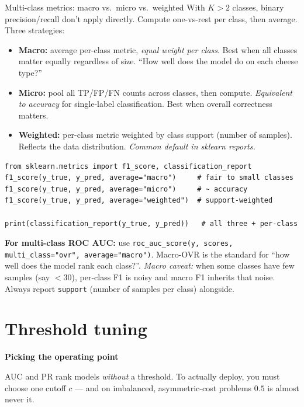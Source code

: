 \documentclass[aspectratio=169]{beamer}
\begin{document}
\begin{frame}[fragile]{Multi-class metrics: macro vs.\ micro vs.\ weighted}
  With $K > 2$ classes, binary precision/recall don't apply directly. Compute one-vs-rest per class, then average. Three strategies:
  \vfill
  \begin{itemize}\small
    \item \textbf{Macro:} average per-class metric, \emph{equal weight per class}. Best when all classes matter equally regardless of size. ``How well does the model do on each cheese type?''
    \item \textbf{Micro:} pool all TP/FP/FN counts across classes, then compute. \emph{Equivalent to accuracy} for single-label classification. Best when overall correctness matters.
    \item \textbf{Weighted:} per-class metric weighted by class support (number of samples). Reflects the data distribution. \emph{Common default in sklearn reports.}
  \end{itemize}
  \vfill
{\lstset{basicstyle=\ttfamily\scriptsize}
\begin{lstlisting}
from sklearn.metrics import f1_score, classification_report
f1_score(y_true, y_pred, average="macro")     # fair to small classes
f1_score(y_true, y_pred, average="micro")     # ~ accuracy
f1_score(y_true, y_pred, average="weighted")  # support-weighted

print(classification_report(y_true, y_pred))   # all three + per-class
\end{lstlisting}}
  \vfill
  \footnotesize \textbf{For multi-class ROC AUC:} use \texttt{roc\_auc\_score(y, scores, multi\_class="ovr", average="macro")}. Macro-OVR is the standard for ``how well does the model rank each class?''.
  \vskip 2pt
  \scriptsize \emph{Macro caveat:} when some classes have few samples (say $< 30$), per-class F1 is noisy and macro F1 inherits that noise. Always report \texttt{support} (number of samples per class) alongside.
\end{frame}

\section{Threshold tuning}

\begin{frame}[plain]
  \vfill
  \begin{center}
    {\Large\color{popblue}\textbf{Picking the operating point}}\\[0.9em]
    \begin{minipage}{0.82\textwidth}\centering\small
      AUC and PR rank models \emph{without} a threshold. To actually deploy, you must
      choose one cutoff $c$ --- and on imbalanced, asymmetric-cost problems $0.5$ is
      almost never it.
    \end{minipage}
  \end{center}
  \vfill
\end{frame}
\end{document}
